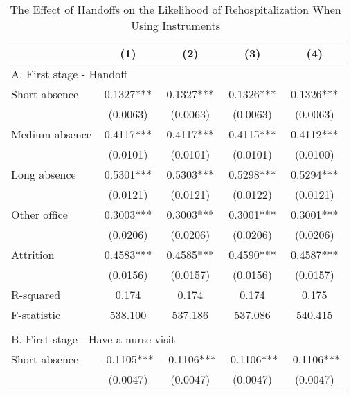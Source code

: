 \documentclass[final,12pt, notitlepage]{article}
\begin{document}
\begin{singlespace}
\begin{table}[H]
\footnotesize
\setlength\tabcolsep{0pt}
\centering
\caption{The Effect of Handoffs on the Likelihood of Rehospitalization When Using Instruments}
\label{tab:iv}
\begin{threeparttable}
{
\def\sym#1{\ifmmode^{#1}\else\(^{#1}\)\fi}
\begin{tabular*}{\textwidth}{l@{\extracolsep{\fill}}*{4}{c}}
\toprule
                    &\multicolumn{1}{c}{(1)}&\multicolumn{1}{c}{(2)}&\multicolumn{1}{c}{(3)}&\multicolumn{1}{c}{(4)}\\
\midrule
\multicolumn{5}{l}{A. First stage - Handoff} \\
Short absence       &      0.1327***&      0.1327***&      0.1326***&      0.1326***\\
                    &    (0.0063)   &    (0.0063)   &    (0.0063)   &    (0.0063)   \\
Medium absence      &      0.4117***&      0.4117***&      0.4115***&      0.4112***\\
                    &    (0.0101)   &    (0.0101)   &    (0.0101)   &    (0.0100)   \\
Long absence        &      0.5301***&      0.5303***&      0.5298***&      0.5294***\\
                    &    (0.0121)   &    (0.0121)   &    (0.0122)   &    (0.0121)   \\
Other office        &      0.3003***&      0.3003***&      0.3001***&      0.3001***\\
                    &    (0.0206)   &    (0.0206)   &    (0.0206)   &    (0.0206)   \\
Attrition           &      0.4583***&      0.4585***&      0.4590***&      0.4587***\\
                    &    (0.0156)   &    (0.0157)   &    (0.0156)   &    (0.0157)   \\
R-squared           &       0.174   &       0.174   &       0.174   &       0.175   \\
F-statistic         &     538.100   &     537.186   &     537.086   &     540.415   \\
\\
\multicolumn{5}{l}{B. First stage - Have a nurse visit} \\
Short absence       &     -0.1105***&     -0.1106***&     -0.1106***&     -0.1106***\\
                    &    (0.0047)   &    (0.0047)   &    (0.0047)   &    (0.0047)   \\

\end{tabular*}}
\end{threeparttable}
\end{table}
\end{singlespace}
\end{document}
